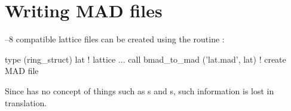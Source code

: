 \section{Writing MAD files}

\mad--8 compatible lattice files can be created using the routine :
\begin{example}
  type (ring_struct) lat             ! lattice
  ...
  call bmad_to_mad ('lat.mad', lat)  ! create MAD file
\end{example}

Since \mad has no concept of things such as s and s, such 
information is lost in translation.

